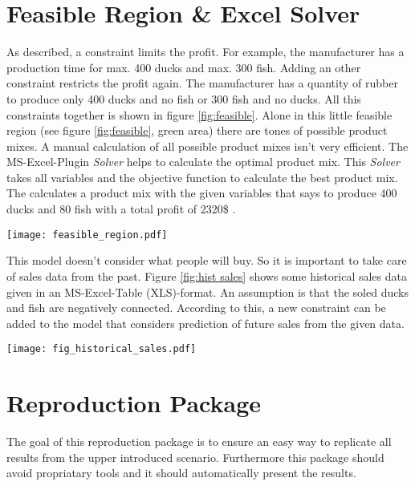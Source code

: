 \documentclass{article}
\begin{document}
\begin{multicols}{2}
\section{Feasible Region \& Excel Solver}\label{cap:feasible}
As described, a constraint limits the profit. For example, the manufacturer has a production time for max. 400 ducks and max. 300 fish. Adding an other constraint restricts the profit again. The manufacturer has a quantity of rubber to produce only 400 ducks and no fish or 300 fish and no ducks. All this constraints together is shown in figure \ref{fig:feasible}. Alone in this little feasible region (see figure \ref{fig:feasible}, green area) there are tones of possible product mixes. A manual calculation of all possible product mixes isn't very efficient. The MS-Excel-Plugin \textit{Solver} \cite{microsoft} helps to calculate the optimal product mix. This \textit{Solver} takes all variables and the objective function to calculate the best product mix. The  calculates a product mix with the given variables that says to produce 400 ducks and 80 fish with a total profit of 2320\$ \cite[p. 96]{micheal}.

\begin{center}
\texttt{[image: feasible\_region.pdf]}
\label{fig:feasible}
\end{center}

This model doesn't consider what people will buy. So it is important to take care of sales data from the past. Figure \ref{fig:hist sales} shows some historical sales data given in an MS-Excel-Table (XLS)-format. An assumption is that the soled ducks and fish are negatively connected. According to this, a new constraint can be added to the model that considers prediction of future sales from the given data.

\begin{center}
\texttt{[image: fig\_historical\_sales.pdf]}
\label{fig:hist sales}
\end{center}

\section{Reproduction Package}
The goal of this reproduction package is to ensure an easy way to replicate all results from the upper introduced scenario. Furthermore this package should avoid propriatary tools and it should automatically present the results.



\end{multicols}
\end{document}
